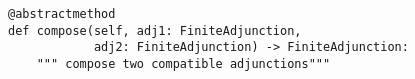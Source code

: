 \par\begin{minipage}{60ex}
\begin{verbatim}
@abstractmethod
def compose(self, adj1: FiniteAdjunction,
            adj2: FiniteAdjunction) -> FiniteAdjunction:
    """ compose two compatible adjunctions"""
\end{verbatim}
\end{minipage}\par